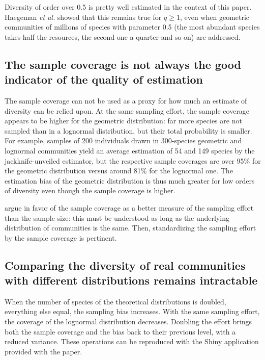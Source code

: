 \documentclass[fleqn,10pt]{latex/stylish_article} %
\begin{document}
Diversity of order over 0.5 is pretty well estimated in the context of this paper.
Haegeman \emph{et al.} showed that this remains true for \(q \geq 1\), even when geometric communities of millions of species with parameter 0.5 (the most abundant species takes half the resources, the second one a quarter and so on) are addressed.

\hypertarget{the-sample-coverage-is-not-always-the-good-indicator-of-the-quality-of-estimation}{%
\subsection{The sample coverage is not always the good indicator of the quality of estimation}\label{the-sample-coverage-is-not-always-the-good-indicator-of-the-quality-of-estimation}}

The sample coverage can not be used as a proxy for how much an estimate of diversity can be relied upon.
At the same sampling effort, the sample coverage appears to be higher for the geometric distribution: far more species are not sampled than in a lognormal distribution, but their total probability is smaller.
For example, samples of 200 individuals drawn in 300-species geometric and lognormal communities yield an average estimation of 54 and 149 species by the jackknife-unveiled estimator, but the respective sample coverages are over 95\% for the geometric distribution versus around 81\% for the lognormal one. The estimation bias of the geometric distribution is thus much greater for low orders of diversity even though the sample coverage is higher.

\citet{Chao2012b} argue in favor of the sample coverage as a better measure of the sampling effort than the sample size: this must be understood as long as the underlying distribution of communities is the same.
Then, standardizing the sampling effort by the sample coverage is pertinent.

\hypertarget{comparing-the-diversity-of-real-communities-with-different-distributions-remains-intractable}{%
\subsection{Comparing the diversity of real communities with different distributions remains intractable}\label{comparing-the-diversity-of-real-communities-with-different-distributions-remains-intractable}}

When the number of species of the theoretical distributions is doubled, everything else equal, the sampling bias increases.
With the same sampling effort, the coverage of the lognormal distribution decreases.
Doubling the effort brings both the sample coverage and the bias back to their previous level, with a reduced variance.
These operations can be reproduced with the Shiny application provided with the paper.
\end{document}
